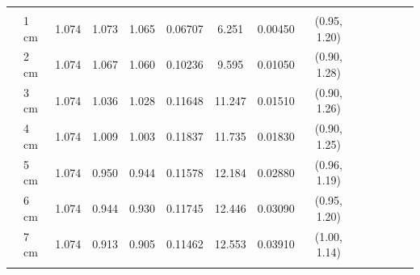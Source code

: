 \documentclass[a4paper 12pt]{article}
\numberwithin{equation}{section}
\begin{document}
\begin{small}
\begin{table}[h!]
\begin{footnotesize}
\begin{tabular}{clclclclclclcl}
 \raisebox{1ex}{\bf age 6+}  \\ [1.0ex]
&   1 cm & 1.074 &    1.073 & 1.065 &          0.06707& 6.251  & 0.00450 & (0.95, 1.20)\\
&   2 cm & 1.074 &    1.067 & 1.060 &          0.10236& 9.595  & 0.01050 & (0.90, 1.28)\\
&   3 cm & 1.074 &    1.036 & 1.028 &          0.11648& 11.247 & 0.01510 & (0.90, 1.26)\\
&   4 cm & 1.074 &    1.009 & 1.003 &          0.11837& 11.735 & 0.01830 & (0.90, 1.25)\\
&   5 cm & 1.074 &    0.950 & 0.944 &          0.11578& 12.184 & 0.02880 & (0.96, 1.19)\\
&   6 cm & 1.074 &    0.944 & 0.930 &          0.11745& 12.446 & 0.03090 & (0.95, 1.20)\\
&   7 cm & 1.074 &    0.913 & 0.905 &          0.11462& 12.553 & 0.03910 & (1.00, 1.14) \\[1.5ex]
  \hline \\
\end{tabular}
\end{footnotesize}
\end{table}
 \end{small}
\end{document}

